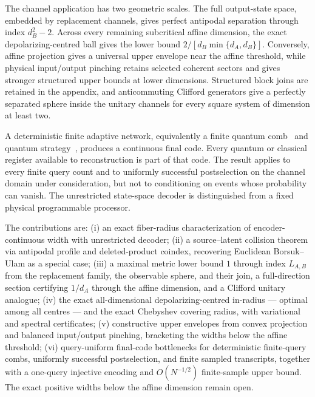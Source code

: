 \documentclass[11pt,a4paper]{article}
\theoremstyle{definition}
\theoremstyle{plain}
\theoremstyle{remark}
\begin{document}
The channel application has two geometric scales. The full output-state
space, embedded by replacement channels, gives perfect antipodal separation
through index $d_B^2-2$. Across every remaining subcritical affine dimension,
the exact depolarizing-centred ball gives the lower bound
$2/[d_B\min\{d_A,d_B\}]$. Conversely, affine projection gives a universal
upper envelope near the affine threshold, while physical input/output
pinching retains selected coherent sectors and gives stronger structured
upper bounds at lower dimensions. Structured block joins are retained in
the appendix, and anticommuting Clifford generators give a perfectly
separated sphere inside the unitary channels for every square system of
dimension at least two.

A deterministic finite adaptive network, equivalently a finite quantum comb~\cite{Chiribella2009} and quantum strategy~\cite{GutoskiWatrous2007}, produces a continuous final code. Every quantum or
classical register available to reconstruction is part of that code. The
result applies to every finite query count and to uniformly successful
postselection on the channel domain under consideration, but not to
conditioning on events whose probability can vanish. The unrestricted
state-space decoder is distinguished from a fixed physical programmable
processor.

The contributions are: (i) an exact fiber-radius characterization of encoder-continuous width with unrestricted decoder; (ii) a source--latent collision theorem via antipodal profile and deleted-product coindex, recovering Euclidean Borsuk--Ulam as a special case; (iii) a maximal metric lower bound $1$ through index $L_{A,B}$ from the replacement family, the observable sphere, and their join, a full-direction section certifying $1/d_A$ through the affine dimension, and a Clifford unitary analogue; (iv) the exact all-dimensional depolarizing-centred in-radius --- optimal among all centres --- and the exact Chebyshev covering radius, with variational and spectral certificates; (v) constructive upper envelopes from convex projection and balanced input/output pinching, bracketing the widths below the affine threshold; (vi) query-uniform final-code bottlenecks for deterministic finite-query combs, uniformly successful postselection, and finite sampled transcripts, together with a one-query injective encoding and $O(N^{-1/2})$ finite-sample upper bound. The exact positive widths below the affine dimension remain open.
\end{document}
